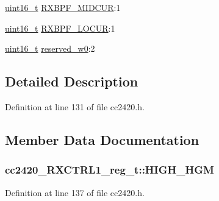 \begin{DoxyCompactItemize}
\item 
\hyperlink{_p_e___types_8h_a1f1825b69244eb3ad2c7165ddc99c956}{uint16\+\_\+t} \hyperlink{structcc2420___r_x_c_t_r_l1__reg__t_a9bcf478fb1c5eff2770d239c35c6ece8}{R\+X\+B\+P\+F\+\_\+\+M\+I\+D\+C\+UR}\+:1
\item 
\hyperlink{_p_e___types_8h_a1f1825b69244eb3ad2c7165ddc99c956}{uint16\+\_\+t} \hyperlink{structcc2420___r_x_c_t_r_l1__reg__t_a28cecf230ff1779371ca2fa1da57e8af}{R\+X\+B\+P\+F\+\_\+\+L\+O\+C\+UR}\+:1
\item 
\hyperlink{_p_e___types_8h_a1f1825b69244eb3ad2c7165ddc99c956}{uint16\+\_\+t} \hyperlink{structcc2420___r_x_c_t_r_l1__reg__t_a94ab016cba9f995b7b1961d70f4263a0}{reserved\+\_\+w0}\+:2
\end{DoxyCompactItemize}


\subsection{Detailed Description}


Definition at line 131 of file cc2420.\+h.



\subsection{Member Data Documentation}
\subsubsection[{\texorpdfstring{H\+I\+G\+H\+\_\+\+H\+GM}{HIGH_HGM}}]{ cc2420\+\_\+\+R\+X\+C\+T\+R\+L1\+\_\+reg\+\_\+t\+::\+H\+I\+G\+H\+\_\+\+H\+GM}\hypertarget{structcc2420___r_x_c_t_r_l1__reg__t_a084dd26f259d235bda7c0b9eec652c5e}{}\label{structcc2420___r_x_c_t_r_l1__reg__t_a084dd26f259d235bda7c0b9eec652c5e}


Definition at line 137 of file cc2420.\+h.

